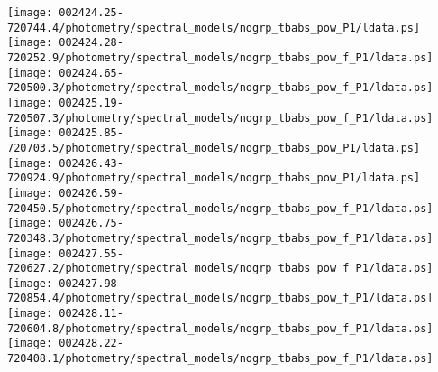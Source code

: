 \documentclass{aastex}
\begin{document}
\begin{figure*}[!ht]
\centering
\texttt{[image: 002424.25-720744.4/photometry/spectral\_models/nogrp\_tbabs\_pow\_P1/ldata.ps]} \hfill 
\texttt{[image: 002424.28-720252.9/photometry/spectral\_models/nogrp\_tbabs\_pow\_f\_P1/ldata.ps]} \hfill 
\texttt{[image: 002424.65-720500.3/photometry/spectral\_models/nogrp\_tbabs\_pow\_f\_P1/ldata.ps]} \\ 
\vspace*{0.5in}
\texttt{[image: 002425.19-720507.3/photometry/spectral\_models/nogrp\_tbabs\_pow\_f\_P1/ldata.ps]} \hfill 
\texttt{[image: 002425.85-720703.5/photometry/spectral\_models/nogrp\_tbabs\_pow\_P1/ldata.ps]} \hfill 
\texttt{[image: 002426.43-720924.9/photometry/spectral\_models/nogrp\_tbabs\_pow\_P1/ldata.ps]} \\ 
\vspace*{0.5in}
\texttt{[image: 002426.59-720450.5/photometry/spectral\_models/nogrp\_tbabs\_pow\_f\_P1/ldata.ps]} \hfill 
\texttt{[image: 002426.75-720348.3/photometry/spectral\_models/nogrp\_tbabs\_pow\_f\_P1/ldata.ps]} \hfill 
\texttt{[image: 002427.55-720627.2/photometry/spectral\_models/nogrp\_tbabs\_pow\_f\_P1/ldata.ps]} \\ 
\vspace*{0.5in}
\texttt{[image: 002427.98-720854.4/photometry/spectral\_models/nogrp\_tbabs\_pow\_f\_P1/ldata.ps]} \hfill 
\texttt{[image: 002428.11-720604.8/photometry/spectral\_models/nogrp\_tbabs\_pow\_f\_P1/ldata.ps]} \hfill 
\texttt{[image: 002428.22-720408.1/photometry/spectral\_models/nogrp\_tbabs\_pow\_f\_P1/ldata.ps]} \\ 
\vspace*{0.5in}
\end{figure*}
\clearpage
\end{document}
